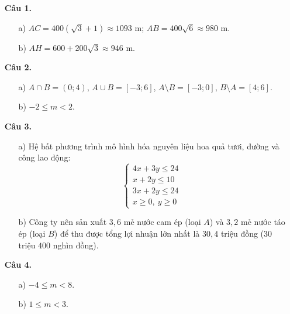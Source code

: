 \documentclass[12pt,a4paper]{article}
\begin{document}
\begin{enumerate}[leftmargin=1.5em, itemsep=6pt]
    \item[\textbf{Câu 1.}] 
    \begin{itemize}[leftmargin=1.2em, itemsep=2pt]
        \item[a)] $AC = 400(\sqrt{3} + 1) \approx 1093\text{ m}$; \quad $AB = 400\sqrt{6} \approx 980\text{ m}$.
        \item[b)] $AH = 600 + 200\sqrt{3} \approx 946\text{ m}$.
    \end{itemize}

    \item[\textbf{Câu 2.}] 
    \begin{itemize}[leftmargin=1.2em, itemsep=2pt]
        \item[a)] $A \cap B = (0; 4)$, \quad $A \cup B = [-3; 6]$, \quad $A \setminus B = [-3; 0]$, \quad $B \setminus A = [4; 6]$.
        \item[b)] $-2 \le m < 2$.
    \end{itemize}

    \item[\textbf{Câu 3.}] 
    \begin{itemize}[leftmargin=1.2em, itemsep=2pt]
        \item[a)] Hệ bất phương trình mô hình hóa nguyên liệu hoa quả tươi, đường và công lao động:
        \[
        \begin{cases}
        4x + 3y \le 24 \\
        x + 2y \le 10 \\
        3x + 2y \le 24 \\
        x \ge 0,\ y \ge 0
        \end{cases}
        \]
        \item[b)] Công ty nên sản xuất $3{,}6$ mẻ nước cam ép (loại $A$) và $3{,}2$ mẻ nước táo ép (loại $B$) để thu được tổng lợi nhuận lớn nhất là $30{,}4$ triệu đồng ($30$ triệu $400$ nghìn đồng).
    \end{itemize}

    \item[\textbf{Câu 4.}] 
    \begin{itemize}[leftmargin=1.2em, itemsep=2pt]
        \item[a)] $-4 \le m < 8$.
        \item[b)] $1 \le m < 3$.
    \end{itemize}
\end{enumerate}

\newpage
\end{document}
